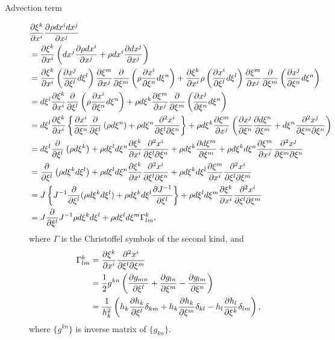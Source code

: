 \begin{description}

\item[Advection term]
\begin{align}
  & \frac{\partial \xi^k}{\partial x^i}\frac{\partial \rho dx^idx^j}{\partial x^j} \nonumber\\
  &= \frac{\partial \xi^k}{\partial x^i}\left(dx^j\frac{\partial \rho dx^i}{\partial x^j} + \rho dx^i\frac{\partial dx^j}{\partial x^j}\right) \nonumber\\
  &= \frac{\partial \xi^k}{\partial x^i}\left(\frac{\partial x^j}{\partial \xi^l}d\xi^l\right)\frac{\partial \xi^m}{\partial x^j}\frac{\partial }{\partial \xi^m}\left(\rho \frac{\partial x^i}{\partial \xi^n}d\xi^n\right)
  + \frac{\partial \xi^k}{\partial x^i}\rho \left(\frac{\partial x^i}{\partial \xi^l}d\xi^l\right)\frac{\partial \xi^m}{\partial x^j}\frac{\partial }{\partial \xi^m}\left(\frac{\partial x^j}{\partial \xi^n}d\xi^n\right) \nonumber\\
  &= d\xi^l\frac{\partial \xi^k}{\partial x^i}\frac{\partial }{\partial \xi^l}\left(\rho \frac{\partial x^i}{\partial \xi^n}d\xi^n\right)
  + \rho d\xi^k\frac{\partial \xi^m}{\partial x^j}\frac{\partial }{\partial \xi^m}\left(\frac{\partial x^j}{\partial \xi^n}d\xi^n\right) \nonumber\\
  &= d\xi^l\frac{\partial \xi^k}{\partial x^i}\left\{\frac{\partial x^i}{\partial \xi^n}\frac{\partial }{\partial \xi^l}\left(\rho d\xi^n\right) + \rho d\xi^n \frac{\partial^2 x^i}{\partial \xi^l \partial \xi^n}\right\}
  + \rho d\xi^k\frac{\partial \xi^m}{\partial x^j} \left( \frac{\partial x^j}{\partial \xi^n}\frac{\partial d\xi^n}{\partial \xi^m} + d\xi^n\frac{\partial^2 x^j}{\partial \xi^m \partial \xi^n} \right) \nonumber\\
  &= d\xi^l\frac{\partial }{\partial \xi^l}\left(\rho d\xi^k\right) + \rho d\xi^l d\xi^n\frac{\partial \xi^k}{\partial x^i} \frac{\partial^2 x^i}{\partial \xi^l \partial \xi^n}
  + \rho d\xi^k\frac{\partial d\xi^m}{\partial \xi^m} + \rho d\xi^kd\xi^n\frac{\partial \xi^m}{\partial x^j}\frac{\partial^2 x^j}{\partial \xi^m \partial \xi^n} \nonumber\\
  &= \frac{\partial }{\partial \xi^l}\left(\rho d\xi^k d\xi^l\right) + \rho d\xi^l d\xi^n\frac{\partial \xi^k}{\partial x^i} \frac{\partial^2 x^i}{\partial \xi^l \partial \xi^n}
   + \rho d\xi^kd\xi^l\frac{\partial \xi^m}{\partial x^i}\frac{\partial^2 x^i}{\partial \xi^l \partial \xi^m} \nonumber\\
  &= J\left\{ J^{-1}\frac{\partial }{\partial \xi^l}(\rho d\xi^k d\xi^l) + \rho d\xi^k d\xi^l\frac{\partial J^{-1}}{\partial \xi^l} \right\}
   + \rho d\xi^ld\xi^m\frac{\partial \xi^k}{\partial x^i}\frac{\partial^2 x^i}{\partial \xi^l \partial \xi^m} \nonumber\\
  &= J \frac{\partial }{\partial \xi^l}{J^{-1}\rho d\xi^k d\xi^l} + \rho d\xi^l d\xi^m\Gamma^k_{lm},
\end{align}
where $\Gamma$ is the Christoffel symbols of the second kind, and
\begin{align}
  \Gamma_{lm}^k
  &= \frac{\partial \xi^k}{\partial x^i} \frac{\partial^2 x^i}{\partial \xi^l \partial \xi^m} \nonumber\\
  &= \frac{1}{2}g^{kn}\left( \frac{\partial g_{mn}}{\partial \xi^l} + \frac{\partial g_{ln}}{\partial \xi^m} - \frac{\partial g_{lm}}{\partial \xi^n}\right) \nonumber\\
  &= \frac{1}{h_k^2}\left( h_k\frac{\partial h_k}{\partial \xi^l}\delta_{km}+h_k\frac{\partial h_k}{\partial \xi^m}\delta_{kl}-h_l\frac{\partial h_l}{\partial \xi^k}\delta_{lm}\right),
\end{align}
where $\{g^{kn}\}$ is inverse matrix of $\{g_{kn}\}$.



\end{description}

